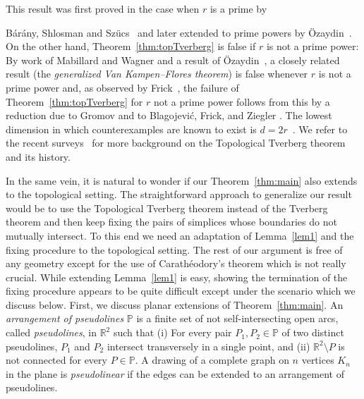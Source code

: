 \documentclass[english,a4paper,nolineno]{lipics-v2019}
\begin{document}
This result was first proved in the case when $r$ is a prime by {B{\'a}r{\'a}ny, Shlosman and Sz{\"u}cs~\cite{BSS1981_topTverbergPrime} and later extended to prime powers by \"{O}zaydin~\cite{O1987_topTverberg}. On the other hand, Theorem~\ref{thm:topTverberg} is false if $r$ is not a prime power: By work of Mabillard and Wagner \cite{MabillardWagner2015} and a result of \"{O}zaydin~\cite{O1987_topTverberg}, a closely related result (the \emph{generalized Van Kampen--Flores theorem}) is false whenever $r$ is not a prime power and, as observed by Frick~\cite{F15_approx}, the failure of  Theorem~\ref{thm:topTverberg} for $r$ not a prime power follows from this by a reduction due to Gromov \cite{Gromov} and to Blagojevi\'{c}, Frick, and Ziegler \cite{BFZ_Constraints_2014}. The lowest dimension in which counterexamples are known to exist is $d=2r$~\cite{AMSW15_codim2,MabillardWagner2015}.
We refer to the recent surveys~\cite{Barany2018,BZ2017_story,S18_user,Z18} for more background on the Topological Tverberg theorem and its history.

In the same vein, it is natural to wonder if our Theorem~\ref{thm:main} also extends to the topological setting. The straightforward approach to generalize our result would be to use the Topological Tverberg theorem instead of the Tverberg theorem and then keep fixing the pairs of simplices whose boundaries do not mutually intersect. To this end we need an adaptation of  Lemma~\ref{lem1}  and the fixing procedure
to the topological setting. The rest of our argument is free of any geometry except for the use of Carath\'{e}odory's theorem which is not really crucial. While extending  Lemma~\ref{lem1} is easy, showing the termination of the fixing procedure appears to be quite difficult except under the scenario which we discuss below.
First, we discuss planar extensions of Theorem~\ref{thm:main}.
An \emph{arrangement of pseudolines} $\mathbb{P}$ is a finite set of not self-intersecting open arcs, called \emph{pseudolines}, in $\mathbb{R}^2$ such that (i) For every pair $P_1,P_2\in \mathbb{P}$ of two distinct pseudolines, $P_1$ and $P_2$ intersect transversely in a single point, and (ii) $\mathbb{R}^2\setminus P$ is not connected for every $P\in \mathbb{P}$.
A drawing of a complete graph on $n$ vertices $K_n$ in the plane is \emph{pseudolinear} if the edges can be extended to an {arrangement of pseudolines}.


}
\end{document}
